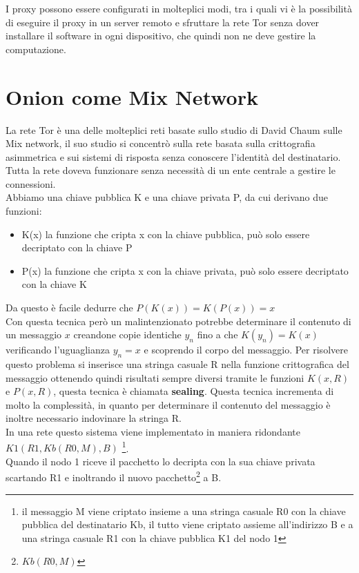 I proxy possono essere configurati in molteplici modi, tra i quali vi è la possibilità di eseguire il proxy in un server remoto e sfruttare la rete Tor senza dover installare il software in ogni dispositivo, che quindi non ne deve gestire la computazione.
\cite{OnionRouting}

\newpage
\section{Onion come Mix Network} \label{sec:OnionMixNetwork}
La rete Tor è una delle molteplici reti basate sullo studio di David Chaum sulle Mix network, il suo studio si concentrò sulla rete basata sulla crittografia asimmetrica e sui sistemi di risposta senza conoscere l'identità del destinatario. Tutta la rete doveva funzionare senza necessità di un ente centrale a gestire le connessioni. \\
Abbiamo una chiave pubblica K e una chiave privata P, da cui derivano due funzioni:
\begin{itemize}
    \item K(x) la funzione che cripta x con la chiave pubblica, può solo essere decriptato con la chiave P
    \item P(x) la funzione che cripta x con la chiave privata, può solo essere decriptato con la chiave K
\end{itemize}
Da questo è facile dedurre che $P(K(x)) = K(P(x)) = x$ \\
Con questa tecnica però un malintenzionato potrebbe determinare il contenuto di un messaggio $x$ creandone copie identiche $y_n$ fino a che $K(y_n) = K(x)$ verificando l'uguaglianza $y_n = x$ e scoprendo il corpo del messaggio. 
Per risolvere questo problema si inserisce una stringa casuale R nella funzione crittografica del messaggio ottenendo quindi risultati sempre diversi tramite le funzioni $K(x,R)$ e $P(x,R)$, questa tecnica è chiamata \textbf{sealing}. 
Questa tecnica incrementa di molto la complessità, in quanto per determinare il contenuto del messaggio è inoltre necessario indovinare la stringa R. \\
In una rete questo sistema viene implementato in maniera ridondante \\ 
$K1(R1, Kb(R0, M), B)$ \footnote{il messaggio M viene criptato insieme a una stringa casuale R0 con la chiave pubblica del destinatario Kb, il tutto viene criptato assieme all'indirizzo B e a una stringa casuale R1 con la chiave pubblica K1 del nodo 1}.\\
Quando il nodo 1 riceve il pacchetto lo decripta con la sua chiave privata scartando R1 e inoltrando il nuovo pacchetto\footnote{$Kb(R0, M)$} a B. 
